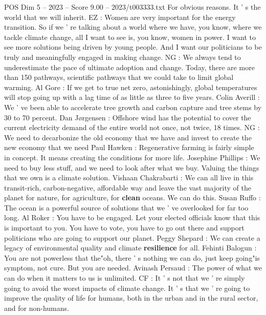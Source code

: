 \begin{textsample}{POS Dim 5 – 2023 – Score 9.00 – 2023/t003333.txt}
For obvious reasons.
It ' s the world that we will inherit.
EZ : Women are very important for the energy transition.
So if we ' re talking about a world where we have, you know, where we tackle climate change, all I want to see is, you know, women in power.
I want to see more solutions being driven by young people.
And I want our politicians to be truly and meaningfully engaged in making change.
NG : We always tend to underestimate the pace of ultimate adoption and change.
Today, there are more than 150 pathways, scientific pathways that we could take to limit global warming.
Al Gore : If we get to true net zero, astonishingly, global temperatures will stop going up with a lag time of as little as three to five years.
Colin Averill : We ' ve been able to accelerate tree growth and carbon capture and tree stems by 30 to 70 percent.
Dan Jørgensen : Offshore wind has the potential to cover the current electricity demand of the entire world not once, not twice, 18 times.
NG : We need to decarbonize the old economy that we have and invest to create the new economy that we need Paul Hawken : Regenerative farming is fairly simple in concept.
It means creating the conditions for more life.
Josephine Phillips : We need to buy less stuff, and we need to look after what we buy.
Valuing the things that we own is a climate solution.
Vishaan Chakrabarti : We can all live in this transit-rich, carbon-negative, affordable way and leave the vast majority of the planet for nature, for agriculture, for \textbf{clean} oceans.
We can do this.
Susan Ruffo : The ocean is a powerful source of solutions that we ' ve overlooked for far too long.
Al Roker : You have to be engaged.
Let your elected officials know that this is important to you.
You have to vote, you have to go out there and support politicians who are going to support our planet.
Peggy Shepard : We can create a legacy of environmental quality and climate \textbf{resilience} for all.
Fehinti Balogun : You are not powerless that the"oh, there ' s nothing we can do, just keep going"is symptom, not cure.
But you are needed.
Avinash Persaud : The power of what we can do when it matters to us is unlimited.
CF : It ' s not that we ' re simply going to avoid the worst impacts of climate change.
It ' s that we ' re going to improve the quality of life for humans, both in the urban and in the rural sector, and for non-humans.

\end{textsample}
